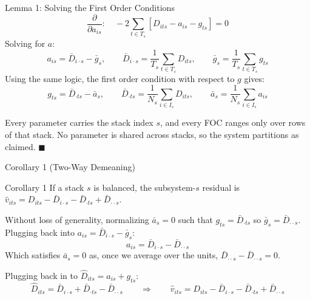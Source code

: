 \documentclass[11pt]{beamer}
\begin{document}
\begin{frame}{Lemma 1: Solving the First Order Conditions}
    \[
        \frac{\partial}{\partial a_{is}}: \quad
        -2 \sum_{t \in T_s} \left[ D_{its} - a_{is} - g_{ts} \right] = 0
    \]
    Solving for $a$:
    \[
        a_{is} = \bar{D}_{i \cdot s} - \bar{g}_s,
        \qquad
        \bar{D}_{i \cdot s} = \frac{1}{T_s} \sum_{t \in T_s} D_{its},
        \qquad
        \bar{g}_s = \frac{1}{T_s} \sum_{t \in T_s} g_{ts}
    \]
    Using the same logic, the first order condition with respect to $g$ gives:
    \[
        g_{ts} = \bar{D}_{\cdot ts} - \bar{a}_s,
        \qquad
        \bar{D}_{\cdot ts} = \frac{1}{N_s} \sum_{i \in I_s} D_{its},
        \qquad
        \bar{a}_s = \frac{1}{N_s} \sum_{i \in I_s} a_{is}
    \]

    \vspace{3mm}

    Every parameter carries the stack index $s$, and every FOC ranges only over
    rows of that stack. No parameter is shared across stacks, so the system
    partitions as claimed. \hfill $\blacksquare$
\end{frame}

\begin{frame}{Corollary 1 (Two-Way Demeaning)}
    \begin{block}{Corollary 1}
        If a stack $s$ is balanced, the subsystem-$s$ residual is
        $\hat{v}_{its} = D_{its} - \bar{D}_{i \cdot s} - \bar{D}_{\cdot ts} + \bar{D}_{\cdot \cdot s}$.
    \end{block}

    Without loss of generality, normalizing $\bar{a}_s = 0$ such that
    $g_{ts} = \bar{D}_{\cdot ts}$ so $\bar{g}_s = \bar{D}_{\cdot \cdot s}$.
    Plugging back into $a_{is} = \bar{D}_{i \cdot s} - \bar{g}_s$:
    \[
        a_{is} = \bar{D}_{i \cdot s} - \bar{D}_{\cdot \cdot s}
    \]
    Which satisfies $\bar{a}_s = 0$ as, once we average over the units,
    $\bar{D}_{\cdot \cdot s} - \bar{D}_{\cdot \cdot s} = 0$.

    \vspace{3mm}

    Plugging back in to $\hat{D}_{its} = a_{is} + g_{ts}$:
    \[
        \hat{D}_{its} = \bar{D}_{i \cdot s} + \bar{D}_{\cdot ts} - \bar{D}_{\cdot \cdot s}
        \qquad \Longrightarrow \qquad
        \hat{v}_{its} = D_{its} - \bar{D}_{i \cdot s} - \bar{D}_{\cdot ts} + \bar{D}_{\cdot \cdot s}
    \]
\end{frame}
\end{document}
